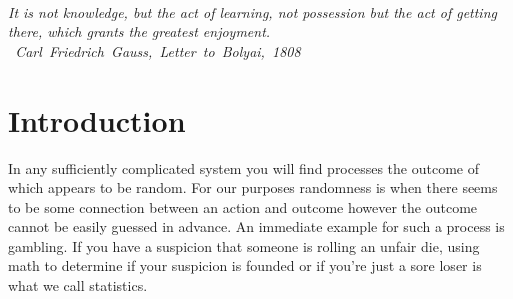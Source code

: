 \documentclass{tufte-book} %
\begin{document}

\tableofcontents %






\cleardoublepage
~\vfill
\begin{doublespace}
\noindent\fontsize{18}{22}\selectfont\itshape
\nohyphenation
It is not knowledge, but the act of learning, not possession but the act of getting there, which grants the greatest enjoyment.\\ \mbox{ Carl Friedrich Gauss, {\itshape Letter to Bolyai, 1808}}
\end{doublespace}
\vfill
\vfill

\cleardoublepage

\mainmatter


\chapter{Introduction}
In any sufficiently complicated system you will find processes the outcome of which appears to be random. For our purposes randomness is when there seems to be some connection between an action and outcome however the outcome cannot be easily guessed in advance. An immediate example for such a process is gambling. If you have a suspicion that someone is rolling an unfair die, using math to determine if your suspicion is founded or if you're just a sore loser is what we call statistics.
\end{document}

